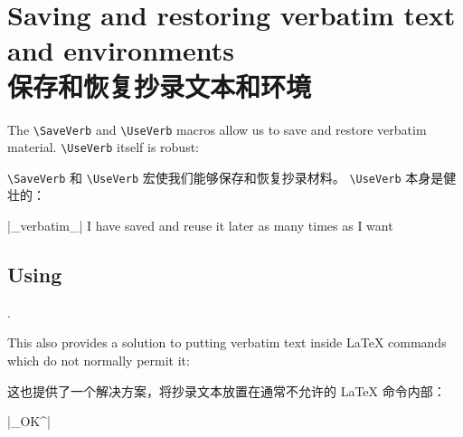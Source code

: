 \documentclass[twoside]{article}
\newcommand\cs[1]{\texttt{\textbackslash#1}}
\newcommand\verbatimTxt{抄录}
\begin{document}
%   \begin{MyVerbatim}[numbers=none,

\section{Saving and restoring verbatim text and environments
\\保存和恢复抄录文本和环境
}


The \cs{SaveVerb} and \cs{UseVerb} macros allow us to save and restore
verbatim material. \cs{UseVerb} itself is robust:

\cs{SaveVerb} 和 \cs{UseVerb} 宏使我们能够保存和恢复抄录材料。 \cs{UseVerb} 本身是健壮的：



\begin{SideBySideExample}
  \DefineShortVerb{\|}
  |_verbatim_|
  I have saved  and reuse 
  it later as many times as I want
  \subsection*{Using }
  .
\end{SideBySideExample}


This also provides a solution to putting verbatim text inside \LaTeX{}
commands which do not normally permit it: %

这也提供了一个解决方案，将抄录文本放置在通常不允许的 \LaTeX{} 命令内部：%


{
\begin{Example}
  \DefineShortVerb{\|}|_OK^| 
\end{Example}
}
\end{document}
